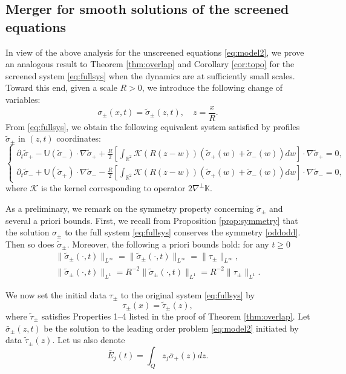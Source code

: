 \documentclass[11pt,reqno]{amsproc}
\newcommand{\pa}{\partial}
\newcommand{\R}{\mathbb{R}}
\newcommand{\U}{\mathbb{U}}
\newcommand{\calK}{\mathcal{K}}
\newcommand{\tsig}{\tilde{\sigma}}
\begin{document}
\subsection{Merger for smooth solutions of the screened equations}
In view of the  above analysis for the unscreened equations \eqref{eq:model2}, we prove an analogous result to Theorem \ref{thm:overlap} and Corollary \ref{cor:topo} for the screened  system \eqref{eq:fullsys} when the dynamics are at sufficiently small scales. Toward this end, given a scale $R > 0$, we introduce the following change of variables:
\begin{equation}
    \label{defn:rescale}
    \sigma_\pm (x,t) = \tilde\sigma_\pm (z,t),\quad z = \frac{x}{R}.
\end{equation}
From \eqref{eq:fullsys}, we obtain the following equivalent system satisfied by profiles $\tilde\sigma_\pm$ in $(z,t)$ coordinates:
\begin{equation}
    \label{eq:tildefullsys}
    \begin{cases}
    \pa_t \tsig_+ - \U(\tsig_-) \cdot \nabla \tsig_+ + \frac{R}{2}\left[\int_{\R^2}\calK(R(z-w))(\tsig_+(w) + \tsig_-(w))dw\right]\cdot \nabla \tsig_+ = 0,\\
    \pa_t \tsig_- + \U(\tsig_+) \cdot \nabla \tsig_- - \frac{R}{2}\left[\int_{\R^2}\calK(R(z-w))(\tsig_+(w) + \tsig_-(w))dw\right]\cdot \nabla \tsig_- = 0,
\end{cases}
\end{equation}
where $\calK$ is the kernel corresponding to operator $2\nabla^\perp \mathbb K$.

As a preliminary, we remark on the symmetry property concerning $\tsig_\pm$ and several a priori bounds. First, we recall from Proposition \ref{prop:symmetry} that the solution $\sigma_\pm$ to the full system \eqref{eq:fullsys} conserves the symmetry \eqref{oddodd}. Then so does $\tsig_\pm$. Moreover, the following a priori bounds hold: for any $t \ge 0$
\begin{equation}
    \label{est:tildeapriori}
    \begin{aligned}
        \|\tsig_\pm(\cdot,t)\|_{L^\infty} = \|\tsig_\pm(\cdot,t)\|_{L^\infty} = \|\tau_\pm\|_{L^\infty},\\
        \|\tsig_\pm(\cdot,t)\|_{L^1} = R^{-2}\|\tsig_\pm(\cdot,t)\|_{L^1} = R^{-2}\|\tau_\pm\|_{L^1}.
    \end{aligned}
\end{equation}

We now set the initial data $\tau_\pm$ to the original system \eqref{eq:fullsys} by
\begin{equation}
    \label{eq:init}
    \tau_\pm(x) = \tilde\tau_\pm(z), 
\end{equation}
where $\tilde\tau_\pm$ satisfies Properties 1--4 listed in the proof of Theorem \ref{thm:overlap}. Let $\bar\sigma_\pm(z,t)$ be the solution to the leading order problem \eqref{eq:model2} initiated by data $\tilde\tau_\pm(z)$. Let us also denote
$$
\bar E_j (t) = \int_Q z_j \bar\sigma_+(z)dz.
$$
\end{document}
